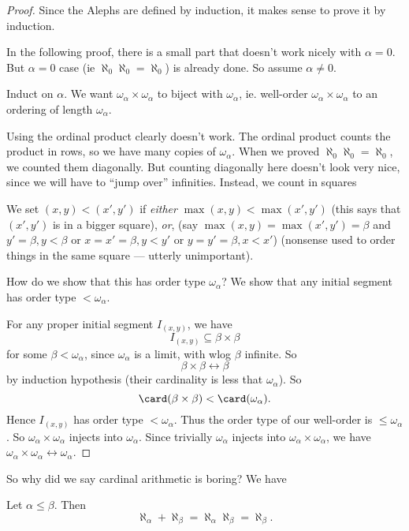 \documentclass[a4paper]{article}
\begin{document}
\begin{proof}
  Since the Alephs are defined by induction, it makes sense to prove it by induction.

  In the following proof, there is a small part that doesn't work nicely with $\alpha = 0$. But $\alpha = 0$ case (ie $\aleph_0\aleph_0 = \aleph_0$) is already done. So assume $\alpha \not= 0$.

  Induct on $\alpha$. We want $\omega_\alpha \times \omega_\alpha$ to biject with $\omega_\alpha$, ie. well-order $\omega_\alpha \times \omega_\alpha$ to an ordering of length $\omega_\alpha$.

  Using the ordinal product clearly doesn't work. The ordinal product counts the product in rows, so we have many copies of $\omega_\alpha$. When we proved $\aleph_0\aleph_0 = \aleph_0$, we counted them diagonally. But counting diagonally here doesn't look very nice, since we will have to ``jump over'' infinities. Instead, we count in squares
  \begin{center}
  \end{center}
  We set $(x, y) < (x', y')$ if \emph{either} $\max(x, y) < \max(x', y')$ (this says that $(x', y')$ is in a bigger square), \emph{or}, (say $\max(x, y) = \max(x', y') = \beta$ and $y' = \beta, y < \beta$ or $x = x' = \beta, y < y'$ or $y = y' = \beta, x < x'$) (nonsense used to order things in the same square --- utterly unimportant).

  How do we show that this has order type $\omega_\alpha$? We show that any initial segment has order type $ < \omega_\alpha$.

  For any proper initial segment $I_{(x, y)}$, we have
  \[
    I_{(x, y)} \subseteq \beta\times \beta
  \]
  for some $\beta < \omega_\alpha$, since $\omega_\alpha$ is a limit, with wlog $\beta$ infinite. So
  \[
    \beta\times \beta \leftrightarrow \beta
  \]
  by induction hypothesis (their cardinality is less that $\omega_\alpha$). So
  \[
    \card(\beta\times \beta) < \card(\omega_\alpha).
  \]
  Hence $I_{(x, y)}$ has order type $ < \omega_\alpha$. Thus the order type of our well-order is $\leq \omega_\alpha$. So $\omega_\alpha \times \omega_\alpha$ injects into $\omega_\alpha$. Since trivially $\omega_\alpha$ injects into $\omega_\alpha \times \omega_\alpha$, we have $\omega_\alpha \times \omega_\alpha \leftrightarrow \omega_\alpha$.
\end{proof}
So why did we say cardinal arithmetic is boring? We have
\begin{cor}
  Let $\alpha \leq \beta$. Then
  \[
    \aleph_\alpha + \aleph_\beta = \aleph_\alpha\aleph_\beta = \aleph_\beta.
  \]
\end{cor}
\end{document}
